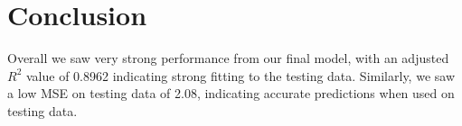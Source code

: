\documentclass{article}
\begin{document}

\section{Conclusion}
Overall we saw very strong performance from our final model, with an adjusted $R^2$ value of 0.8962 indicating strong fitting to the testing data. Similarly, we saw a low MSE on testing data of 2.08, indicating accurate predictions when used on testing data. 
\end{document}
